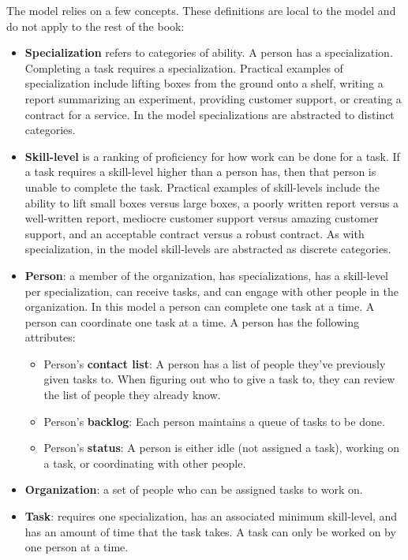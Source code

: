 The model relies on a few concepts. These definitions are local to the model and do not apply to the rest of the book:
\begin{itemize}
    \item \textbf{Specialization} refers to categories of ability. A person has a specialization. Completing a task requires a specialization. Practical examples of specialization include lifting boxes from the ground onto a shelf, writing a report summarizing an experiment, providing customer support, or creating a contract for a service. In the model specializations are abstracted to distinct categories. 
    \item \textbf{Skill-level} is a ranking of proficiency for how work can be done for a task. If a task requires a skill-level higher than a person has, then that person is unable to complete the task. Practical examples of skill-levels include the ability to lift small boxes versus large boxes, a poorly written report versus a well-written report, mediocre customer support versus amazing customer support, and an acceptable contract versus a robust contract. As with specialization, in the model skill-levels are abstracted as discrete categories. 
    \item \textbf{Person}: a member of the organization, has specializations, has a skill-level per specialization, can receive tasks, and can engage with other people in the organization. In this model a person can complete one task at a time. A person can coordinate one task at a time. A person has the following attributes:
    \begin{itemize}
        \item Person's \textbf{contact list}: A person has a list of people they've previously given tasks to. When figuring out who to give a task to, they can review the list of people they already know. 
        \item Person's \textbf{backlog}: Each person maintains a queue of tasks to be done.
        \item Person's \textbf{status}: A person is either idle (not assigned a task), working on a task, or coordinating with other people. 
    \end{itemize}
    \item \textbf{Organization}: a set of people who can be assigned tasks to work on. 
    \item \textbf{Task}: requires one specialization, has an associated minimum skill-level, and has an amount of time that the task takes. A task can only be worked on by one person at a time. 

\end{itemize}
